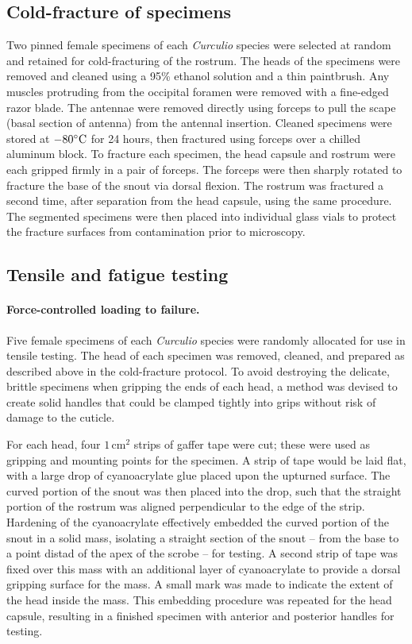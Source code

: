 \documentclass[twocolumn, linenumbers, superscriptaddress, nofootinbib]{revtex4-1}
\begin{document}
		\subsection*{Cold-fracture of specimens}
			Two pinned female specimens of each \textit{Curculio} species were selected at random and retained for cold-fracturing of the rostrum.
			The heads of the specimens were removed and cleaned using a 95\% ethanol solution and a thin paintbrush.
			Any muscles protruding from the occipital foramen were removed with a fine-edged razor blade.
			The antennae were removed directly using forceps to pull the scape (basal section of antenna) from the antennal insertion.
			Cleaned specimens were stored at $-80\degree\text{C}$ for 24 hours, then fractured using forceps over a chilled aluminum block.
			To fracture each specimen, the head capsule and rostrum were each gripped firmly in a pair of forceps.
			The forceps were then sharply rotated to fracture the base of the snout via dorsal flexion.
			The rostrum was fractured a second time, after separation from the head capsule, using the same procedure.
			The segmented specimens were then placed into individual glass vials to protect the fracture surfaces from contamination prior to microscopy.
			
		\subsection*{Tensile and fatigue testing}
			\paragraph*{Force-controlled loading to failure.}
				Five female specimens of each \textit{Curculio} species were randomly allocated for use in tensile testing.
				The head of each specimen was removed, cleaned, and prepared as described above in the cold-fracture protocol.
				To avoid destroying the delicate, brittle specimens when gripping the ends of each head, a method was devised to create solid handles that could be clamped tightly into grips without risk of damage to the cuticle.
				
				For each head, four $1\,\text{cm}^2$ strips of gaffer tape were cut; these were used as gripping and mounting points for the specimen.
				A strip of tape would be laid flat, with a large drop of cyanoacrylate glue placed upon the upturned surface.
				The curved portion of the snout was then placed into the drop, such that the straight portion of the rostrum was aligned perpendicular to the edge of the strip.
				Hardening of the cyanoacrylate effectively embedded the curved portion of the snout in a solid mass, isolating a straight section of the snout -- from the base to a point distad of the apex of the scrobe -- for testing.
				A second strip of tape was fixed over this mass with an additional layer of cyanoacrylate to provide a dorsal gripping surface for the mass.
				A small mark was made to indicate the extent of the head inside the mass.
				This embedding procedure was repeated for the head capsule, resulting in a finished specimen with anterior and posterior handles for testing.
				
\end{document}
